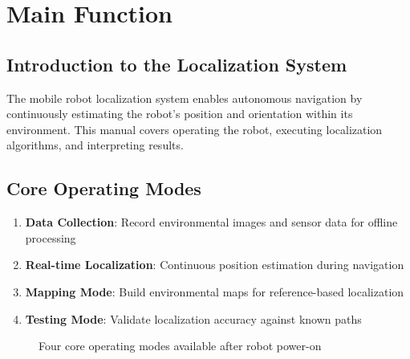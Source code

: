 %
%

\chapter{Main Function}

\section{Introduction to the Localization System}
The mobile robot localization system enables autonomous navigation by continuously estimating the robot's position and orientation within its environment. This manual covers operating the robot, executing localization algorithms, and interpreting results.

\section{Core Operating Modes}
\begin{enumerate}
    \item \textbf{Data Collection}: Record environmental images and sensor data for offline processing
    \item \textbf{Real-time Localization}: Continuous position estimation during navigation
    \item \textbf{Mapping Mode}: Build environmental maps for reference-based localization
    \item \textbf{Testing Mode}: Validate localization accuracy against known paths
\end{enumerate}
\begin{figure}[H]
	\centering
	\caption{Four core operating modes available after robot power-on}
	\label{fig:operating-modes}
\end{figure}



